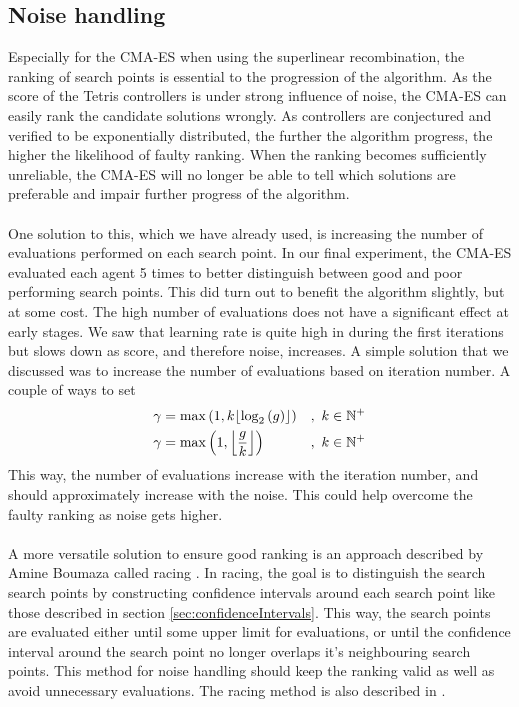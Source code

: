 \subsection{Noise handling}

Especially for the CMA-ES when using the superlinear recombination, the ranking of search
points is essential to the progression of the algorithm. As the score of the Tetris controllers
is under strong influence of noise, the CMA-ES can easily rank the 
candidate solutions wrongly. As controllers are conjectured and verified to
be exponentially distributed, the further the algorithm progress, the higher the likelihood
of faulty ranking. When the ranking becomes sufficiently unreliable, the CMA-ES will
no longer be able to tell which solutions are preferable and impair further progress
of the algorithm.\\
\\
One solution to this, which we have already used, is increasing the number of evaluations
performed on each search point. In our final experiment, the CMA-ES evaluated each agent
5 times to better distinguish between good and poor performing search points. This did turn out
to benefit the algorithm slightly, but at some cost. The high number of evaluations does not have a
significant effect at early stages. We saw that learning rate is quite high in during the first 
iterations but slows down as score, and therefore noise, increases. A simple solution
that we discussed  was to increase the number of evaluations based on iteration number.
A couple of ways to set 
\begin{align}
\gamma &=  \max\left( 1, k \lfloor \log_{2} \left( g \right)  \rfloor \right) &,\ k \in \mathbb{N}^+\\
\gamma &=  \max\left( 1, \left \lfloor{ \frac{g}{k} }\right \rfloor \right) &,\ k \in \mathbb{N}^+
\end{align}
This way, the number of evaluations increase with the iteration number, and should approximately
increase with the noise. This could help overcome the faulty ranking as noise gets higher.\\
\\
A more versatile solution to ensure good ranking is an approach described by
Amine Boumaza called racing \citep{boumaza2011:b}. In racing, the goal is to 
distinguish the search search points by constructing confidence intervals around each
search point like those described in section \ref{sec:confidenceIntervals}.
This way, the search points are evaluated either until some upper limit for evaluations,
or until the confidence interval around the search point no longer overlaps it's
neighbouring search points. This method for noise handling should keep the ranking 
valid as well as avoid unnecessary evaluations. The racing method is also described in 
\citep{heidrich-meisner:09c}.


